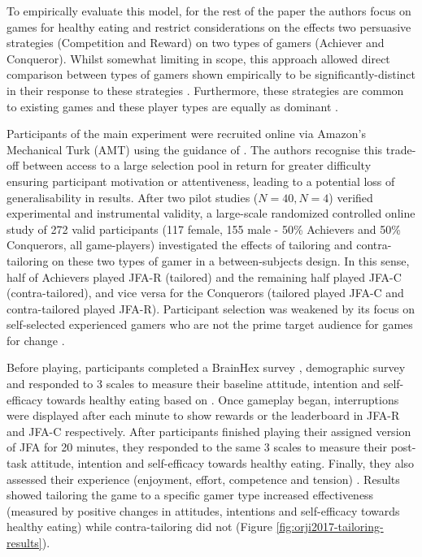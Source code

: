 \documentclass[11pt]{article}
\begin{document}
To empirically evaluate this model, for the rest of the paper the authors focus on games for healthy eating and restrict considerations on the effects two persuasive strategies (Competition and Reward) on two types of gamers (Achiever and Conqueror). Whilst somewhat limiting in scope, this approach allowed direct comparison between types of gamers shown empirically to be significantly-distinct in their response to these strategies \citep{orji2013a}. Furthermore, these strategies are common to existing games \citep{bell2006} and these player types are equally as dominant \citep{bartle1996}. 

Participants of the main experiment were recruited online via Amazon’s Mechanical Turk (AMT) using the guidance of \citet{mason2012}. The authors recognise this trade-off between access to a large selection pool in return for greater difficulty ensuring participant motivation or attentiveness, leading to a potential loss of generalisability in results. After two pilot studies ($N=40, N=4$) verified experimental and instrumental validity, a large-scale randomized controlled online study of 272 valid participants (117 female, 155 male - 50\% Achievers and 50\% Conquerors, all game-players) investigated the effects of tailoring and contra-tailoring on these two types of gamer in a between-subjects design. In this sense, half of Achievers played JFA-R (tailored) and the remaining half played JFA-C (contra-tailored), and vice versa for the Conquerors (tailored played JFA-C and contra-tailored played JFA-R). Participant selection was weakened by its focus on self-selected experienced gamers who are not the prime target audience for games for change \citep{brox2011}.

Before playing, participants completed a BrainHex survey \citep{nacke2014}, demographic survey and responded to 3 scales to measure their baseline attitude, intention and self-efficacy towards healthy eating based on \citet{ajzen2002}. Once gameplay began, interruptions were displayed after each minute to show rewards or the leaderboard in JFA-R and JFA-C respectively. After participants finished playing their assigned version of JFA for 20 minutes, they responded to the same 3 scales to measure their post-task attitude, intention and self-efficacy towards healthy eating. Finally, they also assessed their experience (enjoyment, effort, competence and tension) \citep{ryan2006}. Results showed tailoring the game to a specific gamer type increased effectiveness (measured by positive changes in attitudes, intentions and self-efficacy towards healthy eating) while contra-tailoring did not (Figure \ref{fig:orji2017-tailoring-results}).
\end{document}
